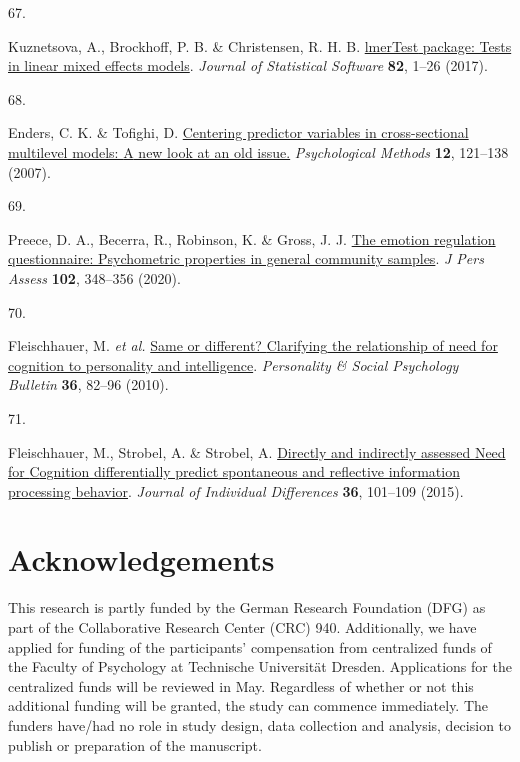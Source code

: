 \documentclass[
  man,floatsintext]{apa6}
\newlength{\cslhangindent}
\newlength{\csllabelwidth}
\newlength{\cslentryspacingunit} %
\newenvironment{CSLReferences}[2] %
 {%
  \setlength{\parindent}{0pt}
  \ifodd #1
  \let\oldpar\par
  \def\par{\hangindent=\cslhangindent\oldpar}
  \fi
  \setlength{\parskip}{#2\cslentryspacingunit}
 }%
 {}
\newcommand{\CSLLeftMargin}[1]{\parbox[t]{\csllabelwidth}{#1}}
\newcommand{\CSLRightInline}[1]{\parbox[t]{\linewidth - \csllabelwidth}{#1}\break}
\begin{document}
\begin{CSLReferences}{0}{0}
\leavevmode{}%
\CSLLeftMargin{67. }%
\CSLRightInline{Kuznetsova, A., Brockhoff, P. B. \& Christensen, R. H. B. \href{https://doi.org/10.18637/jss.v082.i13}{{lmerTest} package: Tests in linear mixed effects models}. \emph{Journal of Statistical Software} \textbf{82}, 1--26 (2017).}

\leavevmode{}%
\CSLLeftMargin{68. }%
\CSLRightInline{Enders, C. K. \& Tofighi, D. \href{https://doi.org/10.1037/1082-989x.12.2.121}{Centering predictor variables in cross-sectional multilevel models: {A} new look at an old issue.} \emph{Psychological Methods} \textbf{12}, 121--138 (2007).}

\leavevmode{}%
\CSLLeftMargin{69. }%
\CSLRightInline{Preece, D. A., Becerra, R., Robinson, K. \& Gross, J. J. \href{https://doi.org/10.1080/00223891.2018.1564319}{The emotion regulation questionnaire: Psychometric properties in general community samples}. \emph{J Pers Assess} \textbf{102}, 348--356 (2020).}

\leavevmode{}%
\CSLLeftMargin{70. }%
\CSLRightInline{Fleischhauer, M. \emph{et al.} \href{https://doi.org/10.1177/0146167209351886}{Same or different? {Clarifying} the relationship of need for cognition to personality and intelligence}. \emph{Personality \& Social Psychology Bulletin} \textbf{36}, 82--96 (2010).}

\leavevmode{}%
\CSLLeftMargin{71. }%
\CSLRightInline{Fleischhauer, M., Strobel, A. \& Strobel, A. \href{https://doi.org/10.1027/1614-0001/a000161}{Directly and indirectly assessed {N}eed for {C}ognition differentially predict spontaneous and reflective information processing behavior}. \emph{Journal of Individual Differences} \textbf{36}, 101--109 (2015).}

\end{CSLReferences}

\endgroup

\newpage

\hypertarget{acknowledgements}{%
\section{Acknowledgements}\label{acknowledgements}}

This research is partly funded by the German Research Foundation (DFG) as part of the Collaborative Research Center (CRC) 940.
Additionally, we have applied for funding of the participants' compensation from centralized funds of the Faculty of Psychology at Technische Universität Dresden.
Applications for the centralized funds will be reviewed in May.
Regardless of whether or not this additional funding will be granted, the study can commence immediately.
The funders have/had no role in study design, data collection and analysis, decision to publish or preparation of the manuscript.
\end{document}
